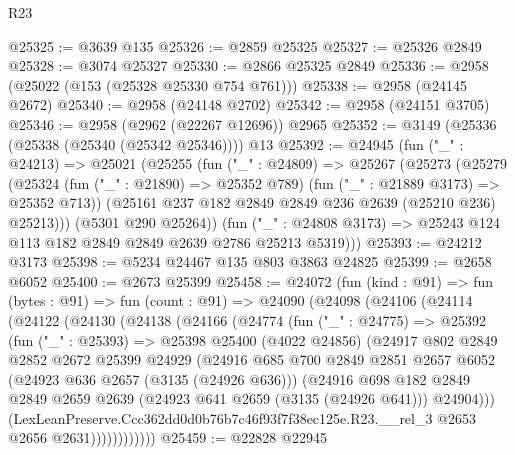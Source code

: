 \begin{lexlean}{R23}
\begin{coremodule}
@25325 := @3639 @135
@25326 := @2859 @25325
@25327 := @25326 @2849
@25328 := @3074 @25327
@25330 := @2866 @25325 @2849
@25336 := @2958 (@25022 (@153 (@25328 @25330 @754 @761)))
@25338 := @2958 (@24145 @2672)
@25340 := @2958 (@24148 @2702)
@25342 := @2958 (@24151 @3705)
@25346 := @2958 (@2962 (@22267 @12696)) @2965
@25352 := @3149 (@25336 (@25338 (@25340 (@25342 @25346)))) @13
@25392 := @24945
    (fun ("_" : @24213) =>
    @25021
      (@25255
        (fun ("_" : @24809) =>
        @25267
          (@25273
            (@25279
              (@25324 (fun ("_" : @21890) => @25352 @789) (fun ("_" : @21889 @3173) => @25352 @713))
              (@25161 @237 @182 @2849 @2849 @236 @2639 (@25210 @236) @25213)))
          (@5301 @290 @25264))
        (fun ("_" : @24808 @3173) => @25243 @124 @113 @182 @2849 @2849 @2639 @2786 @25213 @5319)))
@25393 := @24212 @3173
@25398 := @5234 @24467 @135 @803 @3863 @24825
@25399 := @2658 @6052
@25400 := @2673 @25399
@25458 := @24072
    (fun (kind : @91) =>
    fun (bytes : @91) =>
    fun (count : @91) =>
    @24090
      (@24098
        (@24106
          (@24114
            (@24122
              (@24130
                (@24138
                  (@24166
                    (@24774
                      (fun ("_" : @24775) =>
                      @25392
                        (fun ("_" : @25393) =>
                        @25398
                          @25400
                          (@4022 @24856)
                          (@24917
                            @802
                            @2849
                            @2852
                            @2672
                            @25399
                            @24929
                            (@24916
                              @685
                              @700
                              @2849
                              @2851
                              @2657
                              @6052
                              (@24923 @636 @2657 (@3135 (@24926 @636)))
                              (@24916
                                @698
                                @182
                                @2849
                                @2849
                                @2659
                                @2639
                                (@24923 @641 @2659 (@3135 (@24926 @641)))
                                @24904)))
                          (LexLeanPreserve.Ccc362dd0d0b76b7c46f93f7f38ec125e.R23.__rel_3
                            @2653
                            @2656
                            @2631))))))))))))
@25459 := @22828 @22945

\end{coremodule}
\end{lexlean}
